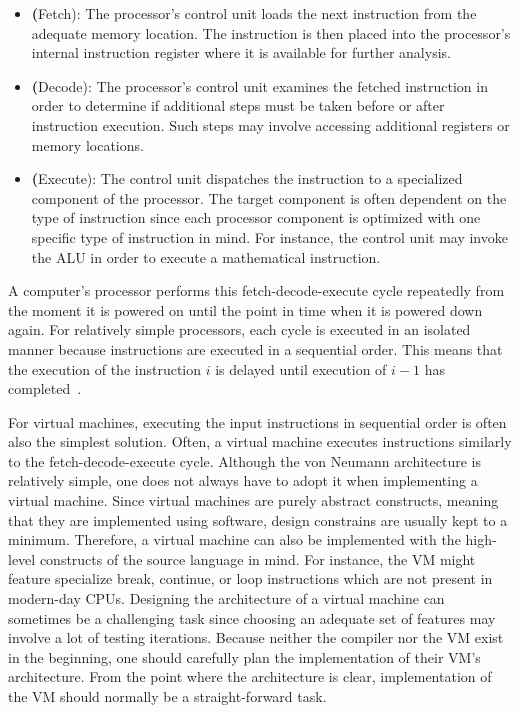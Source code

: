 \begin{itemize}
	\item \textbf(Fetch): The processor's control unit loads the next instruction from the adequate memory location.
	      The instruction is then placed into the processor's internal instruction register where it is available for further analysis.
	\item \textbf(Decode):
	      The processor's control unit examines the fetched instruction in order to determine if additional steps must be taken before or after instruction execution.
	      Such steps may involve accessing additional registers or memory locations.
	\item \textbf(Execute):
	      The control unit dispatches the instruction to a specialized component of the processor.
	      The target component is often dependent on the type of instruction since each processor component is optimized with one specific type of instruction in mind.
	      For instance, the control unit may invoke the ALU in order to execute a mathematical instruction.
\end{itemize}

A computer's processor performs this fetch-decode-execute cycle repeatedly from the moment it is powered on until the point in time when it is powered down again.
For relatively simple processors, each cycle is executed in an isolated manner because instructions are executed in a sequential order.
This means that the execution of the instruction $i$ is delayed until execution of $i - 1$ has completed~\cite[pp.~208-209]{Ledin2020-yp}.

For virtual machines, executing the input instructions in sequential order is often also the simplest solution.
Often, a virtual machine executes instructions similarly to the fetch-decode-execute cycle.
Although the von Neumann architecture is relatively simple, one does not always have to adopt it when implementing a virtual machine.
Since virtual machines are purely abstract constructs, meaning that they are implemented using software, design constrains are usually kept to a minimum.
Therefore, a virtual machine can also be implemented with the high-level constructs of the source language in mind.
For instance, the VM might feature specialize break, continue, or loop instructions which are not present in modern-day CPUs.
Designing the architecture of a virtual machine can sometimes be a challenging task since choosing an adequate set of features may involve a lot of testing iterations.
Because neither the compiler nor the VM exist in the beginning, one should carefully plan the implementation of their VM's architecture.
From the point where the architecture is clear, implementation of the VM should normally be a straight-forward task.

